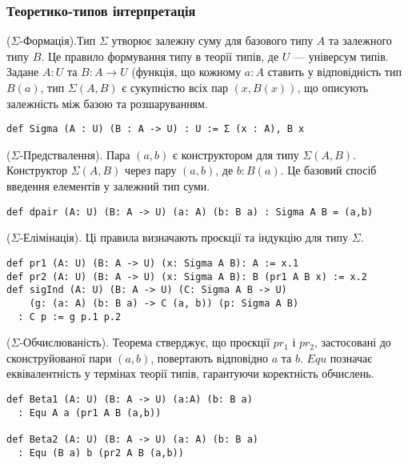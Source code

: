 \subsubsection{Теоретико-типов інтерпретація}

\begin{definition} ($\Sigma$-Формація).Тип $\Sigma$ утворює залежну суму для базового типу $A$ та залежного типу $B$.
Це правило формування типу в теорії типів, де $U$ — універсум типів. Задане $A:U$ та $B:A\rightarrow U$
(функція, що кожному $a:A$ ставить у відповідність тип $B(a)$, тип $\Sigma(A,B)$ є сукупністю всіх пар $(x,B(x))$,
що описують залежність між базою та розшаруванням.
\begin{lstlisting}
def Sigma (A : U) (B : A -> U) : U := Σ (x : A), B x
\end{lstlisting}
\end{definition}

\begin{definition} ($\Sigma$-Предствалення).
Пара $(a,b)$ є конструктором для типу $\Sigma(A,B)$.
Конструктор $\Sigma(A,B)$ через пару $(a,b)$, де $b:B(a)$.
Це базовий спосіб введення елементів у залежний тип суми.

\begin{lstlisting}
def dpair (A: U) (B: A -> U) (a: A) (b: B a) : Sigma A B = (a,b)
\end{lstlisting}
\end{definition}

\begin{definition} ($\Sigma$-Елімінація).
Ці правила визначають проєкції та індукцію для типу $\Sigma$.
\begin{lstlisting}
def pr1 (A: U) (B: A -> U) (x: Sigma A B): A := x.1
def pr2 (A: U) (B: A -> U) (x: Sigma A B): B (pr1 A B x) := x.2
def sigInd (A: U) (B: A -> U) (C: Sigma A B -> U)
    (g: (a: A) (b: B a) -> C (a, b)) (p: Sigma A B)
  : C p := g p.1 p.2
\end{lstlisting}
\end{definition}

\begin{theorem} ($\Sigma$-Обчислюваність).
Теорема стверджує, що проєкції $pr_1$ і $pr_2$, застосовані до сконструйованої пари $(a,b)$, повертають відповідно $a$ та $b$.
$Equ$ позначає еквівалентність у термінах теорії типів, гарантуючи коректність обчислень.
\begin{lstlisting}
def Beta1 (A: U) (B: A -> U) (a:A) (b: B a)
  : Equ A a (pr1 A B (a,b))

def Beta2 (A: U) (B: A -> U) (a: A) (b: B a)
  : Equ (B a) b (pr2 A B (a,b))
\end{lstlisting}
\end{theorem}

